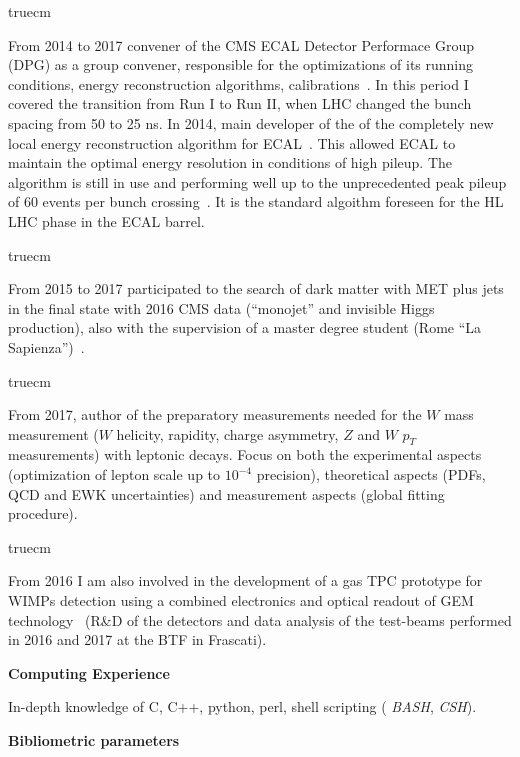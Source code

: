 \documentclass[11pt,twoside,a4paper]{article}
\begin{document}
 truecm

From 2014 to 2017 convener of the CMS ECAL Detector Performace Group
(DPG) as a group convener, responsible for the optimizations of its
running conditions, energy reconstruction algorithms,
calibrations~\cite{photonpaper}. In this period I covered the
transition from Run I to Run II, when LHC changed the bunch spacing
from 50 to 25 ns.  In 2014, main developer of the of the completely
new local energy reconstruction algorithm for
ECAL~\cite{conf_ieee14}. This allowed ECAL to maintain the optimal
energy resolution in conditions of high pileup.  The algorithm is
still in use and performing well up to the unprecedented peak pileup
of 60 events per bunch crossing~\cite{conf_hc16}. It is the standard 
algoithm foreseen for the HL LHC phase in the ECAL barrel.

 truecm

From 2015 to 2017 participated to the search of dark matter with MET
plus jets in the final state with 2016 CMS data (``monojet'' and
invisible Higgs production), also with the supervision of a master
degree student (Rome ``La Sapienza'')~\cite{monojet}.

 truecm

From 2017, author of the preparatory measurements needed for the $W$
mass measurement ($W$ helicity, rapidity, charge asymmetry, $Z$ and
$W$ $p_T$ measurements) with leptonic decays. Focus on both the
experimental aspects (optimization of lepton scale up to $10^{-4}$
precision), theoretical aspects (PDFs, QCD and EWK uncertainties) and
measurement aspects (global fitting procedure).

 truecm

From 2016 I am also involved in the development of a gas TPC prototype
for WIMPs detection using a combined electronics and optical readout
of GEM technology~\cite{pinci_jinst} (R\&D of the detectors and data analysis of the
test-beams performed in 2016 and 2017 at the BTF in Frascati).


\begin{center}
 { \bf Computing  Experience }
\end{center}

In-depth knowledge of C, C++, python, perl, shell scripting ({\it
  BASH}, {\it CSH}).


 
\newpage

\begin{center}
  {\bf Bibliometric parameters}
\end{center}
\end{document}
